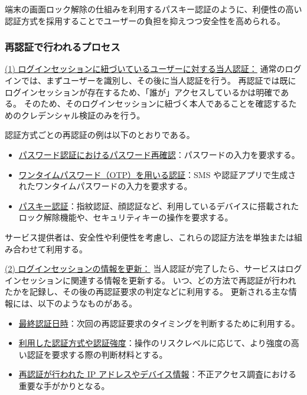 \documentclass[uplatex]{jsarticle}
\def\label#1{}%
\begin{document}
端末の画面ロック解除の仕組みを利用するパスキー認証のように、利便性の高い認証方式を採用することでユーザーの負担を抑えつつ安全性を高められる。

\subsubsection{再認証で行われるプロセス}

\underline{(1) ログインセッションに紐づいているユーザーに対する当人認証：}
通常のログインでは、まずユーザーを識別し、その後に当人認証を行う。
再認証では既にログインセッションが存在するため、「誰が」アクセスしているかは明確である。
そのため、そのログインセッションに紐づく本人であることを確認するためのクレデンシャル検証のみを行う。

\begin{exa}[認証方式ごとの再認証]\label{exa:ch3-reauth-methods}
認証方式ごとの再認証の例は以下のとおりである。
\begin{itemize}
\item \underline{パスワード認証におけるパスワード再確認}：パスワードの入力を要求する。
\item \underline{ワンタイムパスワード（OTP）を用いる認証}：SMS や認証アプリで生成されたワンタイムパスワードの入力を要求する。
\item \underline{パスキー認証}：指紋認証、顔認証など、利用しているデバイスに搭載されたロック解除機能や、セキュリティキーの操作を要求する。
\end{itemize}
\end{exa}

サービス提供者は、安全性や利便性を考慮し、これらの認証方法を単独または組み合わせて利用する。

\underline{(2) ログインセッションの情報を更新：}
当人認証が完了したら、サービスはログインセッションに関連する情報を更新する。
いつ、どの方法で再認証が行われたかを記録し、その後の再認証要求の判定などに利用する。
更新される主な情報には、以下のようなものがある。
\begin{itemize}
\item \underline{最終認証日時}：次回の再認証要求のタイミングを判断するために利用する。
\item \underline{利用した認証方式や認証強度}：操作のリスクレベルに応じて、より強度の高い認証を要求する際の判断材料とする。
\item \underline{再認証が行われた IP アドレスやデバイス情報}：不正アクセス調査における重要な手がかりとなる。
\end{itemize}
\end{document}
